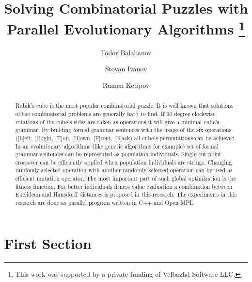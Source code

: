 \documentclass[runningheads]{llncs}
\begin{document}
\title{Solving Combinatorial Puzzles with Parallel Evolutionary Algorithms \thanks{This work was supported by a private funding of Velbazhd Software LLC.}}

\author{Todor Balabanov \and
Stoyan Ivanov \and
Rumen Ketipov}


\maketitle

\begin{abstract}
Rubik's cube is the most popular combinatorial puzzle. It is well known that solutions of the combinatorial problems are generally hard to find. If 90 degree clockwise rotations of the cube's sides are taken as operations it will give a minimal cube's grammar. By building formal grammar sentences with the usage of the six operations ([L]eft, [R]ight, [T]op, [D]own, [F]ront, [B]ack) all cube's permutations can be achieved. In an evolutionary algorithms (like genetic algorithms for example) set of formal grammar sentences can be represented as population individuals. Single cut point crossover can be efficiently applied when population individuals are strings. Changing randomly selected operation with another randomly selected operation can be used as efficient mutation operator. The most important part of such global optimization is the fitness function. For better individuals fitness value evaluation a combination between Euclidean and Hausdorff distances is proposed in this research. The experiments in this research are done as parallel program written in C++ and Open MPI.

\end{abstract}

\section{First Section}
\end{document}
